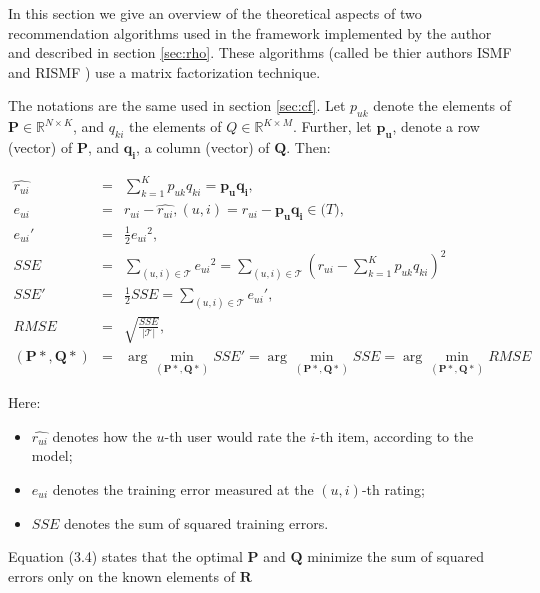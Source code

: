 \documentclass[11pt]{amsart}
\begin{document}
In this section we give an overview of the theoretical aspects of two recommendation algorithms used in the framework implemented by the author and described in section \ref{sec:rho}. These algorithms (called be thier authors ISMF and RISMF \cite{takacs09scalable}) use a matrix factorization technique.

The notations are the same used in section \ref{sec:cf}. Let $p_{uk}$ denote the elements of $\mathbf{P} \in \mathbb{R}^{N \times K}$, and $q_{ki}$ the elements of $Q \in \mathbb{R}^{K \times M}$. Further, let $\mathbf{p_u}$, denote a row (vector) of $\mathbf{P}$, and $\mathbf{q_i}$, a column (vector) of $\mathbf{Q}$. Then:

\begin{eqnarray}
 \hat{r_{ui}}   &=& \sum_{k=1}^K p_{uk}q_{ki} = \mathbf{p_u}\mathbf{q_i}, \\
       e_{ui}   &=& r_{ui}-\hat{r_{ui}}, (u, i) = r_{ui} - {\mathbf{p_u}\mathbf{q_i}} \in \mathcal(T), \nonumber \\
       {e_{ui}}'&=& \frac{1}{2}{e_{ui}}^2, \\
       SSE      &=& \sum_{(u,i)\in \mathcal{T}} {e_{ui}}^2 = \sum_{(u,i)\in \mathcal{T}} {\left( r_{ui} - \sum_{k=1}^K p_{uk}q_{ki} \right)}^2 \nonumber \\
       SSE'     &=& \frac{1}{2}SSE = \sum_{(u,i)\in \mathcal{T}} {e_{ui}}', \nonumber \\
       RMSE     &=& \sqrt{\frac{SSE}{|\mathcal{T}|}}, \nonumber \\ 
       (\mathbf{P*}, \mathbf{Q*}) &=& \arg\!\min_{\boldsymbol{(\mathbf{P*}, \mathbf{Q*})}}SSE'  = \arg\!\min_{\boldsymbol{(\mathbf{P*}, \mathbf{Q*})}} SSE = \arg\!\min_{\boldsymbol{(\mathbf{P*}, \mathbf{Q*})}} RMSE \label{eq4}
\end{eqnarray}

Here:

\begin{itemize}
	\item $\hat{r_{ui}}$ denotes how the $u$-th user would rate the $i$-th item, according to the model;
	\item $e_{ui}$ denotes the training error measured at the $(u,i)$-th rating;
	\item $SSE$ denotes the sum of squared training errors.
\end{itemize}

Equation (3.4) states that the optimal $\mathbf{P}$ and $\mathbf{Q}$ minimize the sum of squared errors only on the known elements of $\mathbf{R}$
\end{document}
